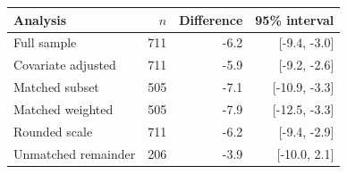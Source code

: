 \begin{tabular}{lrrr}
\toprule
Analysis & $n$ & Difference & 95\% interval \\
\midrule
Full sample & 711 & -6.2 & [-9.4, -3.0] \\
Covariate adjusted & 711 & -5.9 & [-9.2, -2.6] \\
Matched subset & 505 & -7.1 & [-10.9, -3.3] \\
Matched weighted & 505 & -7.9 & [-12.5, -3.3] \\
Rounded scale & 711 & -6.2 & [-9.4, -2.9] \\
Unmatched remainder & 206 & -3.9 & [-10.0, 2.1] \\
\bottomrule
\end{tabular}
